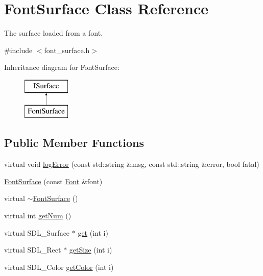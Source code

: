 \hypertarget{class_font_surface}{}\section{Font\+Surface Class Reference}
\label{class_font_surface}


The surface loaded from a font.  




{\ttfamily \#include $<$font\+\_\+surface.\+h$>$}

Inheritance diagram for Font\+Surface\+:\begin{figure}[H]
\begin{center}
\leavevmode
\includegraphics[height=2.000000cm]{class_font_surface}
\end{center}
\end{figure}
\subsection*{Public Member Functions}
\begin{DoxyCompactItemize}
\item 
virtual void \mbox{\hyperlink{class_font_surface_a65cff9ff5d923f472b868b8ccf976fba}{log\+Error}} (const std\+::string \&msg, const std\+::string \&error, bool fatal)
\item 
\mbox{\hyperlink{class_font_surface_af8e3c82416727b71fd13f8f49ffbb3ef}{Font\+Surface}} (const \mbox{\hyperlink{class_font}{Font}} \&font)
\item 
virtual \mbox{\hyperlink{class_font_surface_a0b009ae8b96cc763e70e31c2c76a0807}{$\sim$\+Font\+Surface}} ()
\item 
virtual int \mbox{\hyperlink{class_font_surface_a432d08d23f82d9513332a579c91e1ee6}{get\+Num}} ()
\item 
virtual S\+D\+L\+\_\+\+Surface $\ast$ \mbox{\hyperlink{class_font_surface_a611d81ba179c87aef331d8b5dbef2eb6}{get}} (int i)
\item 
virtual S\+D\+L\+\_\+\+Rect $\ast$ \mbox{\hyperlink{class_font_surface_a42f135c62ef42a0dfddbdf6d8351ef61}{get\+Size}} (int i)
\item 
virtual S\+D\+L\+\_\+\+Color \mbox{\hyperlink{class_font_surface_afe2bf10c79f421c252fe6a1477ee03dd}{get\+Color}} (int i)
\end{DoxyCompactItemize}


